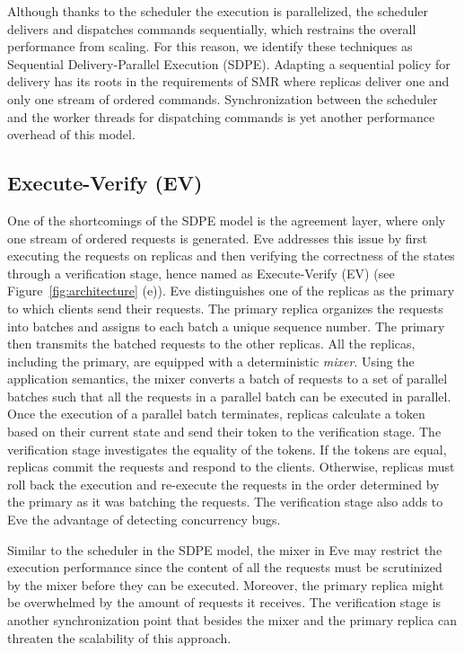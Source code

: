 \documentclass[conference]{IEEEtran}
\begin{document}
Although thanks to the scheduler the execution is parallelized, the scheduler delivers and dispatches commands sequentially, which restrains the overall performance from scaling.
For this reason, we identify these techniques as Sequential Delivery-Parallel Execution (SDPE). 
Adapting a sequential policy for delivery has its roots in the requirements of SMR where replicas deliver one and only one stream of ordered commands. Synchronization between the scheduler and the worker threads for dispatching commands is yet another performance overhead of this model. 



\subsection{Execute-Verify (EV)}
\label{sec:eve}
One of the shortcomings of the SDPE model is the agreement layer, where only one stream of ordered requests is generated. 
Eve addresses this issue by first executing the requests on replicas and then verifying the correctness of the states through a verification stage, hence named as Execute-Verify (EV) (see Figure~\ref{fig:architecture} (e)). 
Eve distinguishes one of the replicas as the primary to which clients send their requests. 
The primary replica organizes the requests into batches and assigns to each batch a unique sequence number. 
The primary then transmits the batched requests to the other replicas. 
All the replicas, including the primary, are equipped with a deterministic \emph{mixer}. 
Using the application semantics, the mixer converts a batch of requests to a set of parallel batches such that all the requests in a parallel batch can be executed in parallel. 
Once the execution of a parallel batch terminates, replicas calculate a token based on their current state and send their token to the verification stage. 
The verification stage investigates the equality of the tokens. 
If the tokens are equal, replicas commit the requests and respond to the clients. 
Otherwise, replicas must roll back the execution and re-execute the requests in the order determined by the primary as it was batching the requests. The verification stage also adds to Eve the advantage of detecting concurrency bugs.

Similar to the scheduler in the SDPE model, the mixer in Eve may restrict the execution performance since the content of all the requests must be scrutinized by the mixer before they can be executed. Moreover, the primary replica might be overwhelmed by the amount of requests it receives. The verification stage is another synchronization point that besides the mixer and the primary replica can threaten the scalability of this approach. 
\end{document}
